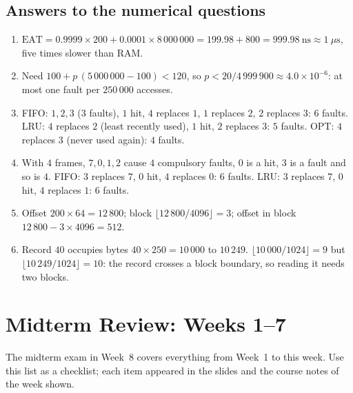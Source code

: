 \documentclass[11pt,a4paper]{article}
\begin{document}
\subsection*{Answers to the numerical questions}
\begin{enumerate}[leftmargin=1.6em,start=11]
  \item $\text{EAT} = 0.9999 \times 200 + 0.0001 \times 8\,000\,000 = 199.98 + 800 = 999.98\ \text{ns} \approx 1\ \mu\text{s}$, five times slower than RAM.
  \item Need $100 + p\,(5\,000\,000 - 100) < 120$, so $p < 20/4\,999\,900 \approx 4.0\times10^{-6}$: at most one fault per $250\,000$ accesses.
  \item FIFO: $1,2,3$ (3 faults), $1$ hit, $4$ replaces $1$, $1$ replaces $2$, $2$ replaces $3$: $6$ faults. LRU: $4$ replaces $2$ (least recently used), $1$ hit, $2$ replaces $3$: $5$ faults. OPT: $4$ replaces $3$ (never used again): $4$ faults.
  \item With $4$ frames, $7,0,1,2$ cause $4$ compulsory faults, $0$ is a hit, $3$ is a fault and so is $4$. FIFO: $3$ replaces $7$, $0$ hit, $4$ replaces $0$: $6$ faults. LRU: $3$ replaces $7$, $0$ hit, $4$ replaces $1$: $6$ faults.
  \item Offset $200 \times 64 = 12\,800$; block $\lfloor 12\,800/4096 \rfloor = 3$; offset in block $12\,800 - 3\times 4096 = 512$.
  \item Record $40$ occupies bytes $40 \times 250 = 10\,000$ to $10\,249$. $\lfloor 10\,000/1024 \rfloor = 9$ but $\lfloor 10\,249/1024 \rfloor = 10$: the record crosses a block boundary, so reading it needs two blocks.
\end{enumerate}

\section{Midterm Review: Weeks 1--7}

The midterm exam in Week~8 covers everything from Week~1 to this week. Use this list as a checklist; each item appeared in the slides and the course notes of the week shown.
\end{document}
